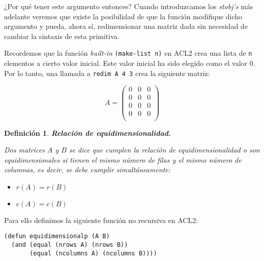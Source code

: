 \documentclass[a4paper,10pt]{article}
\newtheorem{defi}{{Definición}}
\begin{document}
\par \vspace{10pt}

¿Por qué tener este argumento entonces? Cuando introduzcamos los \emph{stobj's} más adelante veremos que existe la posibilidad de que la función modifique dicho argumento y pueda, ahora sí, redimensionar una matriz dada sin necesidad de cambiar la sintaxis de esta primitiva.

\par \vspace{10pt}

Recordemos que la función \emph{built-in} \texttt{(make-list n)} en ACL2 crea una lista de \texttt{n} elementos a cierto valor inicial. Este valor inicial ha sido elegido como el valor 0. Por lo tanto, una llamada a \texttt{redim A 4 3} crea la siguiente matriz:

$$
A=
\begin{pmatrix}
0 & 0 & 0 \\
0 & 0 & 0 \\
0 & 0 & 0 \\ 
0 & 0 & 0 \\ 
\end{pmatrix}
$$ 

\par \vspace{12pt}

\begin{defi} \textbf{Relación de equidimensionalidad.}\vspace{8pt}\par
Dos matrices $A$ y $B$ se dice que cumplen la relación de \emph{equidimensionalidad} o son \emph{equidimensionales} si tienen el mismo número de filas y el mismo número de columnas, es decir, se debe cumplir simultáneamente:
\begin{itemize}
	\item $r(A) = r(B)$
	\item $c(A) = c(B)$
\end{itemize}
\end{defi}

\par \vspace{10pt}

Para ello definimos la siguiente función no recursiva en ACL2:

\par \vspace{10pt}

\begin{lstlisting}[language=clips]
(defun equidimensionalp (A B)
  (and (equal (nrows A) (nrows B))
       (equal (ncolumns A) (ncolumns B))))
\end{lstlisting}
\end{document}
